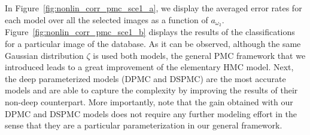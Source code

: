 

In Figure~\ref{fig:nonlin_corr_pmc_sce1_a}, we display the averaged error rates
for each model over all the selected images as a function of $a_{\omega_2}$.
Figure~\ref{fig:nonlin_corr_pmc_sce1_b} displays the results of the
classifications for a particular image of the database. As it can be observed,
although the same Gaussian distribution $\zeta$ is used both models, the general
PMC framework that we introduced leads to a great improvement of the elementary
HMC model. Next, the deep parameterized models (DPMC and DSPMC) are the most
accurate models and are able to capture the complexity by improving the results
of their non-deep counterpart. More importantly, note that the gain obtained
with our DPMC and DSPMC models does not require any further modeling effort in
the sense that they are a particular parameterization in our general framework.



